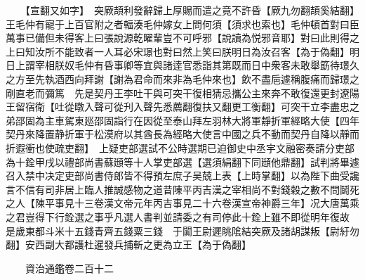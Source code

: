 　　【宣翻又如字】　突厥頡利發辭歸上厚賜而遣之竟不許昏【厥九勿翻頡奚結翻】　王毛仲有寵于上百官附之者輻湊毛仲嫁女上問何須【須求也索也】毛仲頓首對曰臣萬事已備但未得客上曰張說源乾曜輩豈不可呼邪【說讀為悦邪音耶】對曰此則得之上曰知汝所不能致者一人耳必宋璟也對曰然上笑曰朕明日為汝召客【為于偽翻】明日上謂宰相朕奴毛仲有昏事卿等宜與諸逹官悉詣其第既而日中衆客未敢舉筯待璟久之方至先執酒西向拜謝【謝為君命而來非為毛仲來也】飲不盡巵遽稱腹痛而歸璟之剛直老而彌篤　先是契丹王李吐干與可突干復相猜忌攜公主來奔不敢復還更封遼陽王留宿衛【吐從暾入聲可從刋入聲先悉薦翻復扶又翻更工衡翻】可突干立李盡忠之弟邵固為主車駕東廵邵固詣行在因從至泰山拜左羽林大將軍靜折軍經略大使【四年契丹來降置静折軍于松漠府以其酋長為經略大使言中國之兵不動而契丹自降以靜而折遐衝也使疏吏翻】　上疑吏部選試不公時選期已迫御史中丞宇文融密奏請分吏部為十銓甲戌以禮部尚書蘇頲等十人掌吏部選【選須絹翻下同頲他鼎翻】試判將畢遽召入禁中决定吏部尚書侍郎皆不得預左庶子吴兢上表【上時掌翻】以為陛下曲受讒言不信有司非居上臨人推誠感物之道昔陳平丙吉漢之宰相尚不對錢穀之數不問鬬死之人【陳平事見十三卷漢文帝元年丙吉事見二十六卷漢宣帝神爵三年】况大唐萬乘之君豈得下行銓選之事乎凡選人書判並請委之有司停此十銓上雖不即從明年復故　是歲東都斗米十五錢青齊五錢粟三錢　于闐王尉遲眺隂結突厥及諸胡謀叛【尉紆勿翻】安西副大都護杜暹發兵捕斬之更為立王【為于偽翻】

　　資治通鑑卷二百十二


    


 


 



 

 
  







 


　　
　　
　
　
　


　　

　















	
	









































